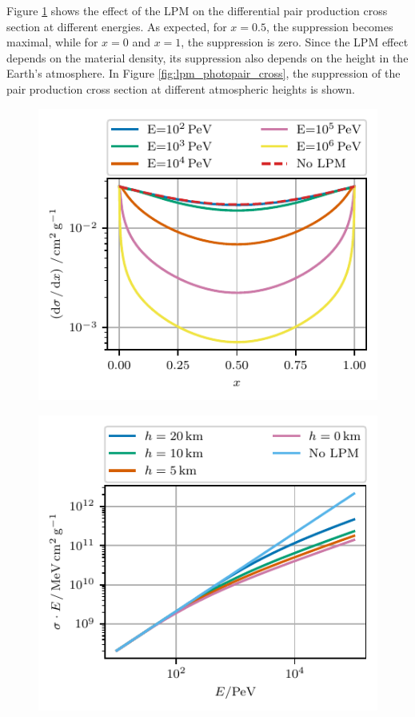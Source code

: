 Figure \ref{fig:lpm_photopair_diff} shows the effect of the LPM on the differential pair production cross section at different energies.
As expected, for $x = 0.5$, the suppression becomes maximal, while for $x=0$ and $x=1$, the suppression is zero.
Since the LPM effect depends on the material density, its suppression also depends on the height in the Earth's atmosphere.
In Figure \ref{fig:lpm_photopair_cross}, the suppression of the pair production cross section at different atmospheric heights is shown.
%
\begin{figure}
\centering
\begin{minipage}[t]{.48\textwidth}
  \centering
  \includegraphics{plots/lpm_photopair_differential_small.pdf}
  \label{fig:lpm_photopair_diff}
\end{minipage}%
\hfill
\begin{minipage}[t]{.48\textwidth}
  \centering
  \includegraphics{plots/lpm_cross_photopair_small.pdf}

\end{minipage}
\end{figure}
